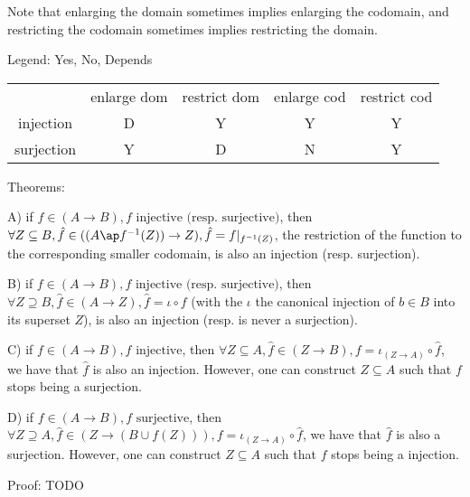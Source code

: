 Note that enlarging the domain sometimes implies enlarging the codomain, and restricting the codomain sometimes implies restricting the domain.

Legend: Yes, No, Depends

\begin{tabular}{c c c c c}
			& enlarge dom	& restrict dom	& enlarge cod	& restrict cod \\
injection	& D				& Y				& Y				& Y            \\
surjection	& Y				& D				& N				& Y
\end{tabular}


Theorems:

A) if $f \in (A \to B), f \text{ injective (resp. surjective)}$, then $\forall Z \subseteq B, \hat{f} \in ((A \ap f^{-1}(Z)) \to Z), \hat{f} = f|_{f^{-1}(Z)}$, the restriction of the function to the corresponding smaller codomain, is also an injection (resp. surjection).

B) if $f \in (A \to B), f \text{ injective (resp. surjective)}$, then $\forall Z \supseteq B, \hat{f} \in (A \to Z), \hat{f} = \iota \circ f$ (with the $\iota$ the canonical injection of $b \in B$ into its superset $Z$), is also an injection (resp. is never a surjection).

C) if $f \in (A \to B), f \text{ injective}$, then $\forall Z \subseteq A, \hat{f} \in (Z \to B), f = \iota_{(Z \to A)} \circ \hat{f}$, we have that $\hat{f}$ is also an injection. However, one can construct $Z \subseteq A$ such that $f$ stops being a surjection.

D) if $f \in (A \to B), f \text{ surjective}$, then $\forall Z \supseteq A, \hat{f} \in (Z \to (B \cup f(Z))), f = \iota_{(Z \to A)} \circ \hat{f}$, we have that $\hat{f}$ is also a surjection. However, one can construct $Z \subseteq A$ such that $f$ stops being a injection.

Proof: TODO

